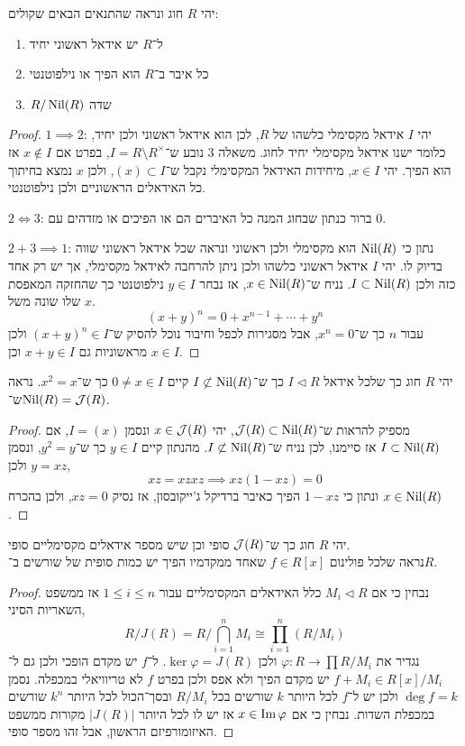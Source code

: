 \question{}
יהי $R$ חוג ונראה שהתנאים הבאים שקולים:
\begin{enumerate}
	\item ל־$R$ יש אידאל ראשוני יחיד
	\item כל איבר ב־$R$ הוא הפיך או נילפוטנטי
	\item $R / \operatorname{Nil}(R)$ שדה
\end{enumerate}
\begin{proof}
	$1 \implies 2$:
	יהי $I$ אידאל מקסימלי כלשהו של $R$, לכן הוא אידאל ראשוני ולכן יחיד, כלומר ישנו אידאל מקסימלי יחיד לחוג.
	משאלה 3 נובע ש־$I = R \setminus R^\times$, בפרט אם $x \notin I$ אז הוא הפיך.
	יהי $x \in I$, מיחידות האידאל המקסימלי נקבל ש־$(x) \subset I$, ולכן $x$ נמצא בחיתוך כל האידאלים הראשוניים ולכן נילפוטנטי.

	$2 \iff 3$:
	ברור כנתון שבחוג המנה כל האיברים הם או הפיכים או מזדהים עם $0$.

	$2 + 3 \implies 1$:
	נתון כי $\operatorname{Nil}(R)$ הוא מקסימלי ולכן ראשוני ונראה שכל אידאל ראשוני שווה בדיוק לו.
	יהי $I$ אידאל ראשוני כלשהו ולכן ניתן להרחבה לאידאל מקסימלי, אך יש רק אחד כזה ולכן $I \subset \operatorname{Nil}(R)$.
	נניח ש־$x \in \operatorname{Nil}(R)$, אז נבחר $y \in I$ נילפוטנטי כך שהחזקה המאפסת שלו שונה משל $x$.
	\[
		{(x + y)}^n
		= 0 + x^{n - 1} + \cdots + y^n
	\]
	עבור $n$ כך ש־$x^n = 0$, אבל מסגירות לכפל וחיבור נוכל להסיק ש־${(x + y)}^n \in I$ ולכן מראשוניות גם $x + y \in I$ וכן $x \in I$.
\end{proof}

\question{}
יהי $R$ חוג כך שלכל אידאל $I \triangleleft R$ כך ש־$I \not\subset \operatorname{Nil}(R)$ קיים $0 \ne x \in I$ כך ש־$x^2 = x$.
נראה ש־$\operatorname{Nil}(R) = \mathcal{J}(R)$.
\begin{proof}
	מספיק להראות ש־$\mathcal{J}(R) \subset \operatorname{Nil}(R)$, יהי $x \in \mathcal{J}(R)$ ונסמן $I = (x)$, אם $I \subset \operatorname{Nil}(R)$ אז סיימנו, לכן נניח ש־$I \not\subset \operatorname{Nil}(R)$.
	מהנתון קיים $y \in I$ כך ש־$y^2 = y$, ונסמן $y = x z$ ולכן,
	\[
		x z = x z x z
		\implies x z (1 - x z) = 0
	\]
	ונתון כי $1 - x z$ הפיך כאיבר ברדיקל ג'ייקובסון, אז נסיק $x z = 0$, ולכן בהכרח $x \in \operatorname{Nil}(R)$.
\end{proof}

\question{}
\subquestion{}
יהי $R$ חוג כך ש־$\mathcal{J}(R)$ סופי וכן שיש מספר אידאלים מקסימליים סופי. \\
נראה שלכל פולינום $f \in R[x]$ שאחד ממקדמיו הפיך יש כמות סופית של שורשים ב־$R$.
\begin{proof}
	נבחין כי אם $M_i \triangleleft R$ כלל האידאלים המקסימליים עבור $1 \le i \le n$ אז ממשפט השאריות הסיני,
	\[
		R / J(R)
		= R / \bigcap_{i = 1}^n M_i
		\cong \prod_{i = 1}^n (R / M_i)
	\]
	נגדיר את $\varphi : R \to \prod R / M_i$ ולכן $\ker \varphi = J(R)$.
	ל־$f$ יש מקדם הופכי ולכן גם ל־$f + M_i \in R[x] / M_i$ יש מקדם הפיך ולא אפס ולכן בפרט $f$ לא טריוויאלי במכפלה.
	נסמן $\deg f = k$ ולכן יש ל־$f$ לכל היותר $k$ שורשים בכל $R / M_i$ ובסך־הכול לכל היותר $k^n$ שורשים במכפלת השדות.
	נבחין כי אם $x \in \operatorname{Im} \varphi$ אז יש לו לכל היותר $|J(R)|$ מקורות ממשפט האיזומורפיזם הראשון, אבל זהו מספר סופי.
\end{proof}

